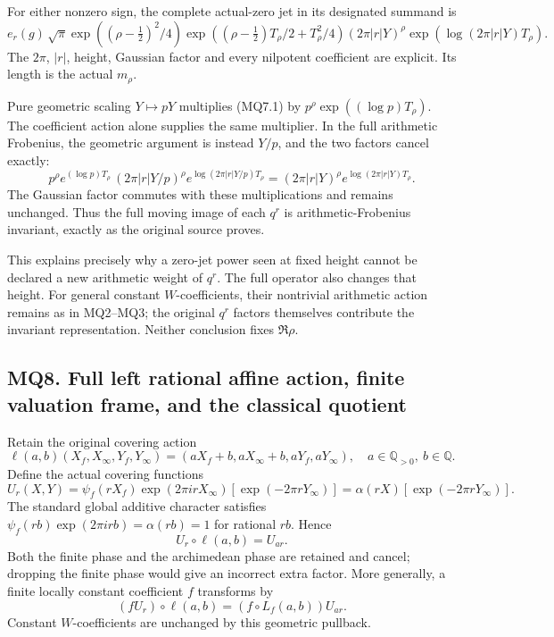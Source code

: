 For either nonzero sign, the complete actual-zero jet in its designated
summand is \[
e_r(g)\,
\sqrt\pi\exp((\rho-\tfrac12)^2/4)
\exp((\rho-\tfrac12)T_\rho/2+T_\rho^2/4)
(2\pi|r|Y)^\rho
\exp(\log(2\pi|r|Y)T_\rho).
\tag{MQ7.1}
\] The \(2\pi\), \(|r|\), height, Gaussian factor and every nilpotent
coefficient are explicit. Its length is the actual \(m_\rho\).

Pure geometric scaling \(Y\mapsto pY\) multiplies (MQ7.1) by
\(p^\rho\exp((\log p)T_\rho)\). The coefficient action alone supplies
the same multiplier. In the full arithmetic Frobenius, the geometric
argument is instead \(Y/p\), and the two factors cancel exactly: \[
p^\rho e^{(\log p)T_\rho}\,
(2\pi|r|Y/p)^\rho e^{\log(2\pi|r|Y/p)T_\rho}
=(2\pi|r|Y)^\rho e^{\log(2\pi|r|Y)T_\rho}.
\tag{MQ7.2}
\] The Gaussian factor commutes with these multiplications and remains
unchanged. Thus the full moving image of each \(q^r\) is
arithmetic-Frobenius invariant, exactly as the original source proves.

This explains precisely why a zero-jet power seen at fixed height cannot
be declared a new arithmetic weight of \(q^r\). The full operator also
changes that height. For general constant \(W\)-coefficients, their
nontrivial arithmetic action remains as in MQ2--MQ3; the original
\(q^r\) factors themselves contribute the invariant representation.
Neither conclusion fixes \(\Re\rho\).

\subsection{MQ8. Full left rational affine action, finite valuation
frame, and the classical
quotient}\label{mq8.-full-left-rational-affine-action-finite-valuation-frame-and-the-classical-quotient}

Retain the original covering action \[
\ell(a,b)(X_f,X_\infty,Y_f,Y_\infty)
=(aX_f+b,aX_\infty+b,aY_f,aY_\infty),
\quad a\in\mathbb Q_{>0},\ b\in\mathbb Q.
\tag{MQ8.1}
\] Define the actual covering functions \[
U_r(X,Y)
=\psi_f(rX_f)\exp(2\pi irX_\infty)
[\exp(-2\pi rY_\infty)]
=\alpha(rX)[\exp(-2\pi rY_\infty)].
\tag{MQ8.2}
\] The standard global additive character satisfies
\(\psi_f(rb)\exp(2\pi irb)=\alpha(rb)=1\) for rational \(rb\). Hence \[
\boxed{U_r\circ\ell(a,b)=U_{ar}.}
\tag{MQ8.3}
\] Both the finite phase and the archimedean phase are retained and
cancel; dropping the finite phase would give an incorrect extra factor.
More generally, a finite locally constant coefficient \(f\) transforms
by \[
(fU_r)\circ\ell(a,b)=(f\circ L_f(a,b))U_{ar}.
\tag{MQ8.4}
\] Constant \(W\)-coefficients are unchanged by this geometric pullback.

